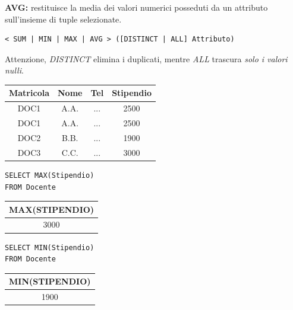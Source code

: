 \documentclass{article}
\begin{document}
\textbf{AVG:} restituisce la media dei valori numerici posseduti da un attributo sull'insieme di tuple selezionate.

\begin{lstlisting}[style=sqlstyle]
< SUM | MIN | MAX | AVG > ([DISTINCT | ALL] Attributo)
\end{lstlisting}
Attenzione, \textit{DISTINCT} elimina i duplicati, mentre \textit{ALL} trascura \textit{solo i valori nulli}.

\begin{table}[h!]
	\begin{tabular}{|c|c|c|c|}
		\hline
		Matricola & Nome & Tel & Stipendio \\
		\hline
		DOC1 & A.A. & ... & 2500 \\
		\hline
				DOC1 & A.A. & ... & 2500 \\
		\hline
				DOC2 & B.B. & ... & 1900 \\
				\hline
				DOC3 & C.C. & ... & 3000 \\
		\hline
	\end{tabular}
\end{table}


\begin{minipage}{0.45\textwidth}
\begin{lstlisting}[style=sqlstyle]
SELECT MAX(Stipendio)
FROM Docente
\end{lstlisting}
\end{minipage}
\hfill
\begin{minipage}{0.45\textwidth}
	\begin{tabular}{|c|}
		\hline
		\textbf{MAX(STIPENDIO)}\\
		\hline
		3000\\
		\hline
	\end{tabular}
\end{minipage}

\begin{minipage}{0.45\textwidth}
\begin{lstlisting}[style=sqlstyle]
SELECT MIN(Stipendio)
FROM Docente
\end{lstlisting}
\end{minipage}\hfill
\begin{minipage}{0.45\textwidth}
	\begin{tabular}{|c|}
	\hline
\textbf{MIN(STIPENDIO)}\\
	\hline
	1900\\
	\hline
	\end{tabular}
\end{minipage}
\end{document}
